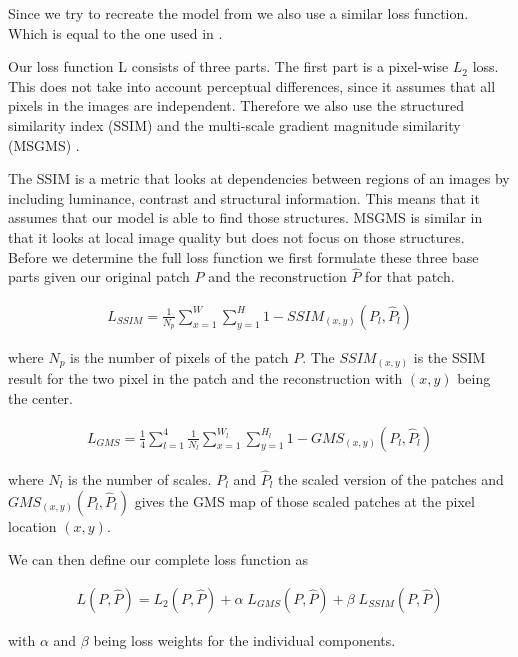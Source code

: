 Since we try to recreate the model from \cite{pirnay_inpainting_2021} we also use a similar loss function. Which is equal to the one used in \cite{zavrtanik_reconstruction_2021}.

Our loss function L consists of three parts. The first part is a pixel-wise $L_2$ loss. This does not take into account perceptual differences, since it assumes that all pixels in the images are independent. Therefore we also use the structured similarity index (SSIM) \cite{bergmann_improving_2019} and the multi-scale gradient magnitude similarity (MSGMS) \cite{xue_gradient_2014, zhang_gradient_2017}.

The SSIM is a metric that looks at dependencies between regions of an images by including luminance, contrast and structural information. This means that it assumes that our model is able to find those structures. MSGMS is similar in that it looks at local image quality but does not focus on those structures.
\\
Before we determine the full loss function we first formulate these three base parts given our original patch $P$ and the reconstruction $\hat{P}$ for that patch.

\begin{align}
L_{SSIM} = \frac{1}{N_p} \sum_{x=1}^{W}\sum_{y=1}^{H}{} {1 - SSIM_{(x,y)}(P_l, \hat{P}_l)}
\end{align}

where $N_p$ is the number of pixels of the patch $P$. The $SSIM_(x,y)$ is the SSIM result for the two pixel in the patch and the reconstruction with $(x,y)$ being the center.

\begin{align}
L_{GMS} = \frac{1}{4} \sum_{l=1}^{4} \frac{1}{N_l} \sum_{x=1}^{W_l}\sum_{y=1}^{H_l}{} {1 - GMS_{(x,y)}(P_l, \hat{P}_l)}
\end{align}

where $N_l$ is the number of scales. $P_l$ and $\hat{P}_l$ the scaled version of the patches and $GMS_{(x,y)}(P_l, \hat{P}_l)$ gives the GMS map of those scaled patches at the pixel location $(x,y)$.

We can then define our complete loss function as 

\begin{align}
L(P, \hat{P}) = L_2(P, \hat{P}) + \alpha \; L_{GMS}(P, \hat{P}) + \beta \; L_{SSIM}(P, \hat{P})
\end{align}

with $\alpha$ and $\beta$ being loss weights for the individual components.

